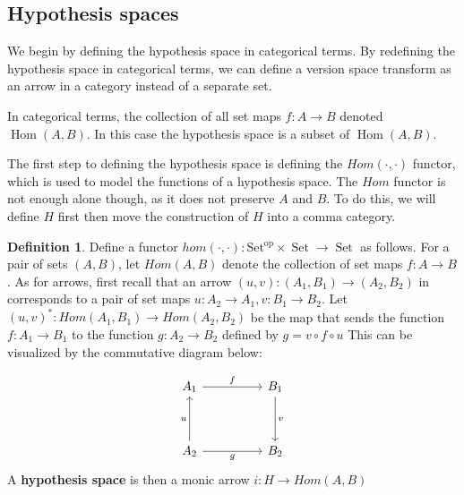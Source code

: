 \documentclass{article}
\theoremstyle{definition}
\newtheorem{definition}{Definition}[section]
\begin{document}
\subsection{Hypothesis spaces}
We begin by defining the hypothesis space in categorical terms. By redefining the hypothesis space in categorical terms, we can define a version space transform as an arrow in a category instead of a separate set. 

In categorical terms, the collection of all set maps $f: A \rightarrow B$ denoted $\operatorname{Hom}(A,B)$. In this case the hypothesis space is a subset of $\operatorname{Hom}(A,B)$. 

The first step to defining the hypothesis space is defining the $Hom(\cdot, \cdot)$ functor, which is used to model the functions of a hypothesis space. The $Hom$ functor is not enough alone though, as it does not preserve $A$ and $B$. To do this, we will define $H$ first then move the construction of $H$ into a comma category.

\begin{definition}
Define a functor $hom(\cdot,\cdot): \operatorname{Set^{op}} \times \operatorname{Set} \rightarrow \operatorname{Set}$ as follows. For a pair of sets $(A,B)$, let $Hom(A,B)$ denote the collection of set maps $f:A\rightarrow B$. As for arrows, first recall that an arrow $(u,v):(A_1, B_1) \rightarrow (A_2, B_2)$ in corresponds to a pair of set maps $u: A_2 \rightarrow A_1, v:B_1\rightarrow B_2$. Let $(u,v)^*: Hom(A_1,B_1) \rightarrow Hom(A_2,B_2)$ be the map that sends the function $f:A_1\rightarrow B_1$ to the function $g: A_2 \rightarrow B_2$ defined by $g=v \circ f \circ u$ This can be visualized by the commutative diagram below: 

\[\begin{tikzcd}
	{A_1} && {B_1} \\
	\\
	{A_2} && {B_2}
	\arrow["f", from=1-1, to=1-3]
	\arrow["u", from=3-1, to=1-1]
	\arrow["g"', from=3-1, to=3-3]
	\arrow["v", from=1-3, to=3-3]
\end{tikzcd}\]
A \textbf{hypothesis space} is then a monic arrow $i:H\rightarrow Hom(A,B)$
\end{definition}
\end{document}
